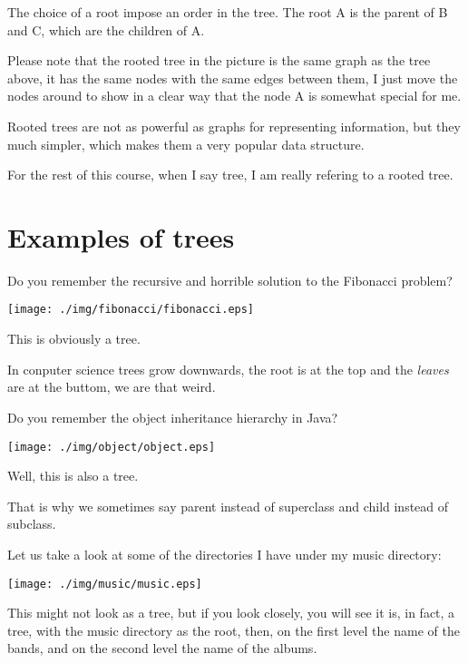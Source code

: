 \documentclass[a4paper, 9pt]{extarticle}
\newcommand{\separator}{\begin{center}%
\noindent\makebox[\linewidth]{\rule{0.75\paperwidth}{0.4pt}}%
\end{center}}
\begin{document}
The choice of a root impose an order in the tree.
The root A is the parent of B and C, which are the children of A.

Please note that the rooted tree in the picture is the same graph as the tree above,
it has the same nodes with the same edges between them,
I just move the nodes around to show in a clear way that the node A is somewhat special for me.

Rooted trees are not as powerful as graphs for representing information,
but they much simpler, which makes them a very popular data structure.

For the rest of this course, when I say tree, I am really refering to a rooted tree.


\section{Examples of trees}

Do you remember the recursive and horrible solution to the Fibonacci problem?

\begin{center}
\texttt{[image: ./img/fibonacci/fibonacci.eps]}
\end{center}

This is obviously a tree.

In conputer science trees grow downwards,
the root is at the top and the \emph{leaves} are at the buttom,
we are that weird.

\separator

Do you remember the object inheritance hierarchy in Java?

\begin{center}
\texttt{[image: ./img/object/object.eps]}
\end{center}

Well, this is also a tree.

That is why we sometimes say parent instead of superclass and child instead of subclass.

\separator
\newpage

Let us take a look at some of the directories I have under my music directory:

\begin{center}
\texttt{[image: ./img/music/music.eps]}
\end{center}

This might not look as a tree, but if you look closely, you will see it is, in
fact, a tree, with the music directory as the root, then, on the first level
the name of the bands, and on the second level the name of the albums.
\end{document}
